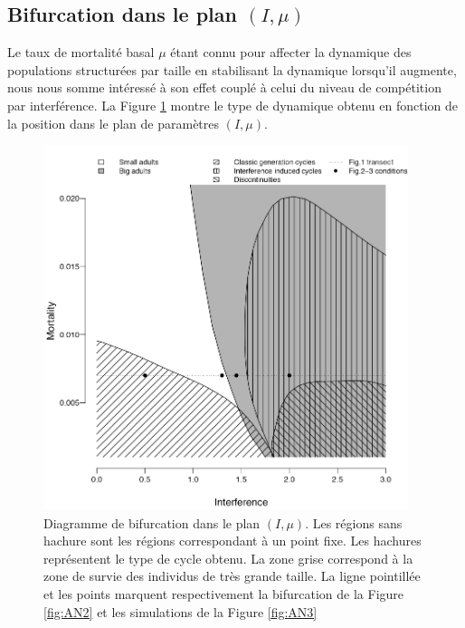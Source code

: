 \subsection{Bifurcation dans le plan $(I,\mu)$}

Le taux de mortalité basal $\mu$ étant connu pour affecter la dynamique des
populations structurées par taille en stabilisant la dynamique lorsqu'il
augmente, nous nous somme intéressé à son effet couplé à celui du niveau de
compétition par interférence. La Figure \ref{fig:AN4} montre le type de
dynamique obtenu en fonction de la position dans le plan de paramètres
$(I,\mu)$.

\begin{figure}[!ht]
\begin{center}
\includegraphics[width=0.95\textwidth]{1_CorpsDeThese/Resumes/Fig/AN05}
\caption[Diagramme de
bifurcation dans le plan $(I,\mu)$]{Diagramme de
bifurcation dans le plan $(I,\mu)$. Les régions sans hachure sont les régions
correspondant à un point fixe. Les hachures représentent le type de cycle
obtenu. La zone grise correspond à la zone de survie des individus de très
grande taille. La ligne pointillée et les points marquent respectivement la
bifurcation de la Figure \ref{fig:AN2} et les simulations de la Figure
\ref{fig:AN3}}
\label{fig:AN4}
\end{center}
\end{figure}

